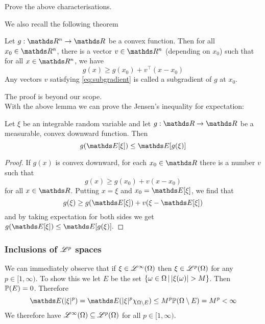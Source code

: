 \begin{exercise}
Prove the above characterisations.
\end{exercise}

We also recall the following theorem
\begin{proposition}
Let $g: \R^n \to \R$ be a convex function. Then for all $x_0 \in \R^n$, there is a vector $v \in \R^n$ (depending on $x_0$) such that for all $x \in \R^n$, we have
\begin{equation} \label{eq:subgradient}
    g(x) \geq g(x_0) + v^\top (x - x_0)
\end{equation}
Any vectors $v$ satisfying \eqref{eq:subgradient} is called a subgradient of $g$ at $x_0$.
\end{proposition}

The proof is beyond our scope. \\

With the above lemma we can prove the Jensen's inequality for expectation:
\begin{theorem}
Let $\xi$ be an integrable random variable and let $g:\R \to \R$ be a measurable, convex downward function. Then
\begin{equation}
    g(\E [\xi]) \leq \E [g(\xi)]
\end{equation}
\end{theorem}
\begin{proof}
If $g(x)$ is convex downward, for each $x_0 \in \R$ there is a number $v$ such that
\begin{equation}
    g(x) \ge g(x_0) + v(x - x_0)
\end{equation}
for all $x \in \R$. Putting $x = \xi$ and $x_0 = \E [\xi]$, we find that
\begin{equation}
    g(\xi) \ge g(\E[\xi]) + v(\xi - \E [\xi])
\end{equation}
and by taking expectation for both sides we get  $g(\E [\xi]) \le \E [g(\xi)].$
\end{proof}

\subsubsection{Inclusions of $\mathcal{L}^p$ spaces}
We can immediately observe that if $\xi \in \mathcal{L}^\infty(\Omega)$ then $\xi \in \mathcal{L}^p(\Omega)$ for any $p \in [1,\infty)$. To show this we let $E$ be the set $\left\{ \omega \in \Omega \,|\, |\xi(\omega)| > M  \right \}$. Then $\mathbb{P}(E) = 0$. Therefore 
\begin{equation} \label{eq:Holder_infty}
    \E(|\xi|^p) = \E(|\xi|^p \chi_{\Omega \setminus E}) \leq M^p \p(\Omega \setminus E) = M^p < \infty
\end{equation}
We therefore have $\mathcal{L}^\infty(\Omega) \subseteq \mathcal{L}^p(\Omega)$ for all $p \in [1,\infty)$.\\

